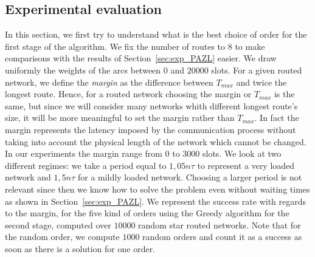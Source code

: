 \documentclass[10pt, conference, letterpaper]{IEEEtran}
\begin{document}
    \subsection{Experimental evaluation}
    \label{sec:resultsPALL}
    In this section, we first try to understand what is the best choice of order for the first stage of the algorithm.
    We fix the number of routes to $8$ to make comparisons with the results of Section~\ref{sec:exp_PAZL} easier. 
    We draw uniformly the weights of the arcs between $0$ and $20000$ slots.
    For a given routed network, we define the {\em margin} as the difference between $T_{max}$ and twice the longest route. 
    Hence, for a routed network choosing the margin or $T_{max}$ is the same, but since we will consider many networks 
    whith different longest route's size, it will be more meaningful to set the margin rather than $T_{max}$.
    In fact the margin represents the latency imposed by the communication process without taking into account the physical length of the network which cannot be changed. In our experiments the margin range from  $0$ to $3000$ slots.
   We look at two different regimes: we take a period equal to $1,05n\tau$ to represent a very loaded network
   and $1,5n\tau$ for a mildly loaded network. Choosing a larger period is not relevant since then we know how to solve the problem even without waiting times as shown in Section~\ref{sec:exp_PAZL}. We represent the success rate with regards to the margin, for the five kind of orders using the Greedy algorithm for the second stage, computed over $10000$ random star routed networks. Note that for the random order, we compute $1000$ random orders and count it as a success as soon as there is a solution for one order. 
   
\end{document}

